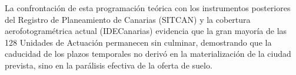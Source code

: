 






La confrontación de esta programación teórica con los instrumentos posteriores del Registro de Planeamiento de Canarias (SITCAN) y la cobertura aerofotogramétrica actual (IDECanarias) evidencia que la gran mayoría de las 128 Unidades de Actuación permanecen sin culminar, demostrando que la caducidad de los plazos temporales no derivó en la materialización de la ciudad prevista, sino en la parálisis efectiva de la oferta de suelo.

